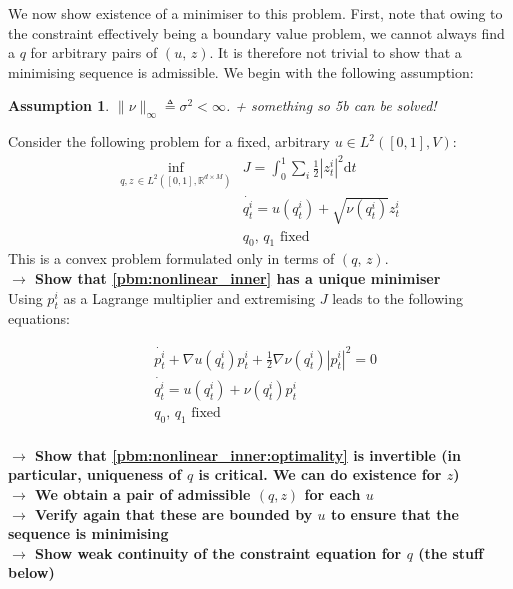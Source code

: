 \documentclass{article}
\newtheorem{assumption}{Assumption}
\newcommand{\half}{\frac 12}
\newcommand{\diff}[1]{\text{d} #1}
\newcommand{\RdM}{\mathbb{R}^{d\times M}}
\begin{document}
We now show existence of a minimiser to this problem. First, note that owing to
the constraint effectively being a boundary value problem, we cannot always find
a $q$ for arbitrary pairs of $(u,\,z)$. It is therefore not trivial to show that
a minimising sequence is admissible. We begin with the following assumption:
\begin{assumption}\label{assumption:nu_bounded}
$\|\nu\|_\infty \triangleq \sigma^2 <\infty$. + something so 5b can be solved!
\end{assumption}

Consider the following problem for a fixed,
arbitrary $u\in L^2([0,1], V)$:
\begin{subequations}\label{pbm:nonlinear_inner}
\begin{align}
\inf_{q, z\, \in L^2([0,1],\RdM)}
    & J = \int_0^1 \sum_i \half |z_t^i|^2 \diff{t}\\
    & \dot{q_t^i} = u(q_t^i) + \sqrt{\nu(q_t^i)} z^i_t\\
    & q_0,\,q_1\text{ fixed}
\end{align}
\end{subequations}
This is a convex problem formulated only in terms of $(q,\,z)$.\\

\textbf{$\longrightarrow$ Show that \eqref{pbm:nonlinear_inner} has a unique minimiser}\\

Using $p_t^i$ as a Lagrange multiplier and extremising $J$ leads to the
following equations:

\begin{subequations}\label{pbm:nonlinear_inner:optimality}
\begin{align}
& \dot{p_t^i} + \nabla u(q_t^i) p_t^i + \half \nabla \nu(q_t^i) |p_t^i|^2 = 0\\
& \dot{q_t^i} = u(q_t^i) + \nu(q_t^i) p^i_t\\
& q_0,\,q_1\text{ fixed}\\
\end{align}
\end{subequations}

\textbf{$\longrightarrow$ Show that \eqref{pbm:nonlinear_inner:optimality} is
invertible (in particular, uniqueness of $q$ is critical. We can do existence
for $z$)}\\
\textbf{$\longrightarrow$ We obtain a pair of admissible $(q,z)$ for each $u$}\\
\textbf{$\longrightarrow$ Verify again that these are bounded by $u$ to ensure
that the sequence is minimising}\\
\textbf{$\longrightarrow$ Show weak continuity of the constraint equation for
$q$ (the stuff below)}\\
\end{document}
